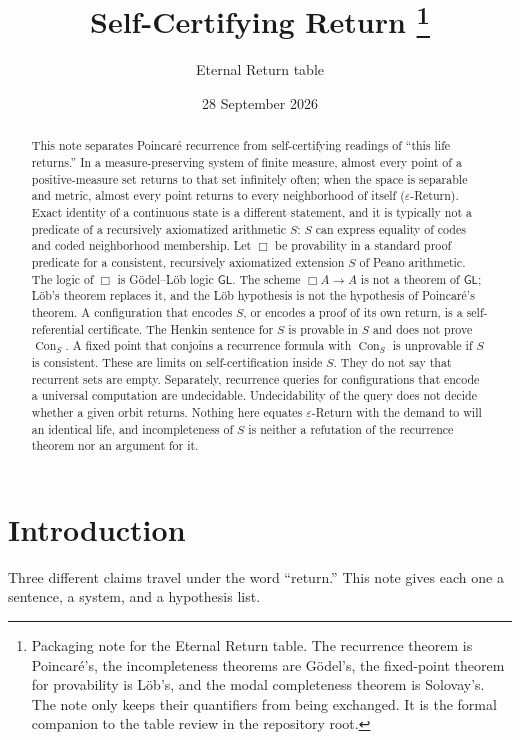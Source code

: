 \documentclass[11pt]{article}
\title{Self-Certifying Return%
\thanks{Packaging note for the Eternal Return table.
The recurrence theorem is Poincar\'e's, the incompleteness theorems are G\"odel's,
the fixed-point theorem for provability is L\"ob's, and the modal completeness theorem is Solovay's.
The note only keeps their quantifiers from being exchanged.
It is the formal companion to the table review in the repository root.}}
\author{Eternal Return table}
\date{28 September 2026}
\DeclareMathOperator{\Con}{Con}
\newcommand{\GL}{\mathsf{GL}}
\theoremstyle{definition}
\theoremstyle{remark}
\begin{document}
\maketitle

\begin{abstract}
This note separates Poincar\'e recurrence from self-certifying readings of ``this life returns.''
In a measure-preserving system of finite measure, almost every point of a positive-measure set returns to that set infinitely often; when the space is separable and metric, almost every point returns to every neighborhood of itself (\(\varepsilon\)-Return).
Exact identity of a continuous state is a different statement, and it is typically not a predicate of a recursively axiomatized arithmetic \(S\): \(S\) can express equality of codes and coded neighborhood membership.
Let \(\Box\) be provability in a standard proof predicate for a consistent, recursively axiomatized extension \(S\) of Peano arithmetic.
The logic of \(\Box\) is G\"odel--L\"ob logic \(\GL\).
The scheme \(\Box A \to A\) is not a theorem of \(\GL\); L\"ob's theorem replaces it, and the L\"ob hypothesis is not the hypothesis of Poincar\'e's theorem.
A configuration that encodes \(S\), or encodes a proof of its own return, is a self-referential certificate.
The Henkin sentence for \(S\) is provable in \(S\) and does not prove \(\Con_S\).
A fixed point that conjoins a recurrence formula with \(\Con_S\) is unprovable if \(S\) is consistent.
These are limits on self-certification inside \(S\).
They do not say that recurrent sets are empty.
Separately, recurrence queries for configurations that encode a universal computation are undecidable.
Undecidability of the query does not decide whether a given orbit returns.
Nothing here equates \(\varepsilon\)-Return with the demand to will an identical life, and incompleteness of \(S\) is neither a refutation of the recurrence theorem nor an argument for it.
\end{abstract}

\section{Introduction}

Three different claims travel under the word ``return.''
This note gives each one a sentence, a system, and a hypothesis list.
\end{document}
